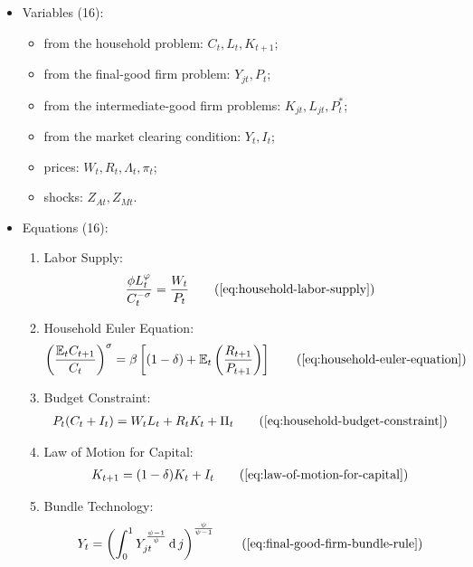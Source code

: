 \documentclass[
thesis.tex
]{subfiles}
\begin{document}
	{\singlespacing
		
		\begin{itemize}
			\item Variables (16):
			
			\begin{itemize}
				\item from the household problem: $C_t, L_t, K_{t+1}$;
				\item from the final-good firm problem: $Y_{jt}, P_t$;
				\item from the intermediate-good firm problems: $K_{jt}, L_{jt}, P_t^\ast$;
				\item from the market clearing condition: $Y_t, I_t$;
				\item prices: $W_t, R_t, \Lambda_t, \pi_t$;
				\item shocks: $Z_{At}, Z_{Mt}$.
			\end{itemize}
			\item Equations (16):
			
			\begin{enumerate}
				\item Labor Supply:
				\begin{align}
					\frac{\phi L_t^{\varphi}}{C_t^{-\sigma}} = \frac{W_t}{P_t}
					\tag{\ref{eq:household-labor-supply}}
				\end{align}
				
				\item Household Euler Equation:
				\begin{align}
					\left( \frac{\mathbb{E}_t C_{t+1}}{C_t} \right)^\sigma = \beta \left[ (1-\delta) + \mathbb{E}_t \left(\frac{R_{t+1}}{P_{t+1}}\right) \right]
					\tag{\ref{eq:household-euler-equation}}
				\end{align}
				
				\item Budget Constraint: 
				\begin{align}
					P_t (C_t + I_t) = W_t L_t + R_t K_t + \Pi_t
					\tag{\ref{eq:household-budget-constraint}}
				\end{align}
				
				\item Law of Motion for Capital:
				\begin{align}
					K_{t+1} = (1-\delta)K_t + I_t
					\tag{\ref{eq:law-of-motion-for-capital}}
				\end{align}
				
				\item Bundle Technology:
				\begin{align}
					Y_t = \left( \int_{0}^{1} Y_{jt}^{\frac{\psi-1}{\psi}} \dif j \right)^{\frac{\psi}{\psi-1}}
					\tag{\ref{eq:final-good-firm-bundle-rule}}
				\end{align}
				

\end{enumerate}
\end{itemize}}
\end{document}
